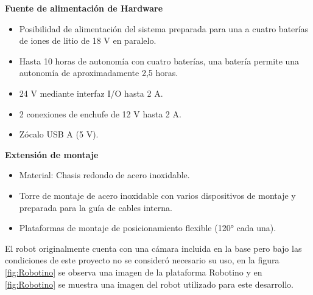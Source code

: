             \phantom{saltodelineaforzado >:D\\}
            
            \textbf{Fuente de alimentación de Hardware}
            \begin{itemize}
                \item Posibilidad de alimentación del sistema preparada para una a cuatro baterías de iones de litio de 18 V en paralelo.
                \item Hasta 10 horas de autonomía con cuatro baterías, una batería permite una autonomía de aproximadamente 2,5 horas.
                \item 24 V mediante interfaz I/O hasta 2 A.
                \item 2 conexiones de enchufe de 12 V hasta 2 A.
                \item Zócalo USB A (5 V).
            \end{itemize}

            \phantom{saltodelineaforzado >:D\\}
            
            \textbf{Extensión de montaje}
            \begin{itemize}
                \item Material: Chasis redondo de acero inoxidable.
                \item Torre de montaje de acero inoxidable con varios dispositivos de montaje y preparada para la guía de cables interna.
                \item Plataformas de montaje de posicionamiento flexible (120° cada una).
            \end{itemize}

            El robot originalmente cuenta con una cámara incluida en la base pero bajo las condiciones de este proyecto no se consideró necesario su uso, en la figura \ref{fig:Robotino} se observa una imagen de la plataforma Robotino y en \ref{fig:Robotino} se muestra una imagen del robot utilizado para este desarrollo.

